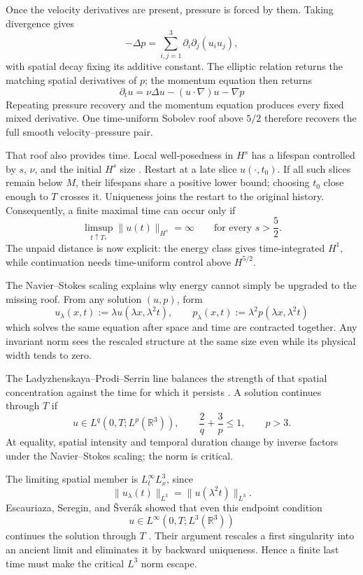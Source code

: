 Once the velocity derivatives are present, pressure is forced by them.  Taking
divergence gives
\[
  -\Delta p
  =
  \sum_{i,j=1}^3\partial_i\partial_j(u_i u_j),
\]
with spatial decay fixing its additive constant.  The elliptic relation returns
the matching spatial derivatives of \(p\); the momentum equation then returns
\[
  \partial_tu
  =
  \nu\Delta u-(u\cdot\nabla)u-\nabla p
\]
Repeating pressure recovery and the momentum equation produces every fixed
mixed derivative.  One time-uniform Sobolev roof above \(5/2\) therefore
recovers the full smooth velocity--pressure pair.

That roof also provides time.  Local well-posedness in \(H^s\) has a lifespan
controlled by \(s\), \(\nu\), and the initial \(H^s\) size
\parencite{FujitaKato1964,Kato1984}.  Restart at a late slice
\(u(\cdot,t_0)\).  If all such slices remain below \(M\), their lifespans share
a positive lower bound; choosing \(t_0\) close enough to \(T\) crosses it.
Uniqueness joins the restart to the original history.  Consequently, a finite
maximal time can occur only if
\[
  \limsup_{t\uparrow T_*}
  \lVert u(t)\rVert_{H^s}
  =\infty
  \qquad
  \text{for every }s>\frac52.
\]
The unpaid distance is now explicit: the energy class gives time-integrated
\(H^1\), while continuation needs time-uniform control above \(H^{5/2}\).


The Navier--Stokes scaling explains why energy cannot simply be upgraded to the
missing roof.  From any solution \((u,p)\), form
\[
  u_\lambda(x,t)
  :=
  \lambda u(\lambda x,\lambda^2t),
  \qquad
  p_\lambda(x,t)
  :=
  \lambda^2p(\lambda x,\lambda^2t)
\]
which solves the same equation after space and time are contracted together.
Any invariant norm sees the rescaled structure at the same size even while its
physical width tends to zero.

The Ladyzhenskaya--Prodi--Serrin line balances the strength of that spatial
concentration against the time for which it persists
\parencite{Prodi1959,Serrin1962,Serrin1963,Ladyzhenskaya1967}.  A solution
continues through \(T\) if
\[
  u\in L^q(0,T;L^p(\mathbb R^3)),
  \qquad
  \frac{2}{q}+\frac{3}{p}\leq1,
  \qquad
  p>3.
\]
At equality, spatial intensity and temporal duration change by inverse factors
under the Navier--Stokes scaling; the norm is critical.

The limiting spatial member is \(L^\infty_tL^3_x\), since
\[
  \lVert u_\lambda(t)\rVert_{L^3}
  =
  \lVert u(\lambda^2t)\rVert_{L^3}.
\]
Escauriaza, Seregin, and \v{S}ver{\'a}k showed that even this endpoint condition
\[
  u\in L^\infty(0,T;L^3(\mathbb R^3))
\]
continues the solution through \(T\)
\parencite{EscauriazaSereginSverak2003}.  Their argument rescales a first
singularity into an ancient limit and eliminates it by backward uniqueness.
Hence a finite last time must make the critical \(L^3\) norm escape.

